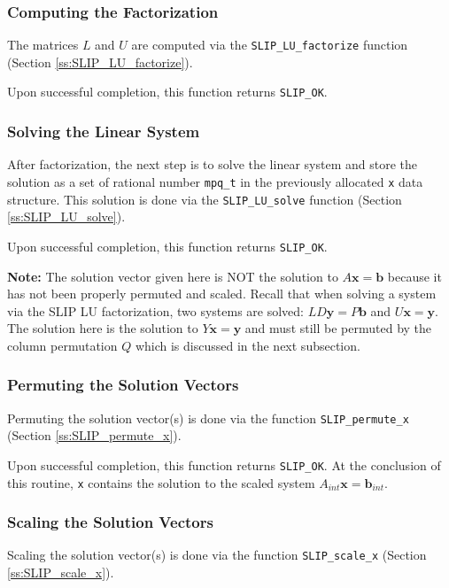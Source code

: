 \documentclass[12pt]{article}
\theoremstyle{definition}
\begin{document}
\subsubsection{Computing the Factorization}

The matrices $L$ and $U$ are computed via the \verb|SLIP_LU_factorize| function (Section \ref{ss:SLIP_LU_factorize}).

Upon successful completion, this function returns \verb|SLIP_OK|.

\subsubsection{Solving the Linear System}

After factorization, the next step is to solve the linear system and store the solution as a set of rational number \verb|mpq_t| in the previously allocated \verb|x| data structure. This solution is done via the \verb|SLIP_LU_solve| function (Section \ref{ss:SLIP_LU_solve}).

Upon successful completion, this function returns \verb|SLIP_OK|.

\textbf{Note:} The solution vector given here is NOT the solution to $A \mathbf{x} = \mathbf{b}$ because it has not been properly permuted and scaled. Recall that when solving a system via the SLIP LU factorization, two systems are solved: $LD \mathbf{y} = P \mathbf{b}$ and $U \mathbf{x} = \mathbf{y}$. The solution here is the solution to $Y \mathbf{x} = \mathbf{y}$ and must still be permuted by the column permutation $Q$ which is discussed in the next subsection.

\subsubsection{Permuting the Solution Vectors}

Permuting the solution vector(s) is done via the function \verb|SLIP_permute_x| (Section \ref{ss:SLIP_permute_x}).

Upon successful completion, this function returns \verb|SLIP_OK|. At the conclusion of this routine, \verb|x| contains the solution to the scaled system $A_{int} \mathbf{x} = \mathbf{b}_{int}$.

\subsubsection{Scaling the Solution Vectors}

Scaling the solution vector(s) is done via the function \verb|SLIP_scale_x| (Section \ref{ss:SLIP_scale_x}).
\end{document}

